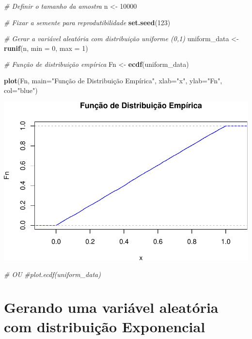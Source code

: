 \documentclass[
]{book}
\newenvironment{Shaded}{\begin{snugshade}}{\end{snugshade}}
\newcommand{\AttributeTok}[1]{\textcolor[rgb]{0.13,0.29,0.53}{#1}}
\newcommand{\CommentTok}[1]{\textcolor[rgb]{0.56,0.35,0.01}{\textit{#1}}}
\newcommand{\DecValTok}[1]{\textcolor[rgb]{0.00,0.00,0.81}{#1}}
\newcommand{\FunctionTok}[1]{\textcolor[rgb]{0.13,0.29,0.53}{\textbf{#1}}}
\newcommand{\NormalTok}[1]{#1}
\newcommand{\OtherTok}[1]{\textcolor[rgb]{0.56,0.35,0.01}{#1}}
\newcommand{\StringTok}[1]{\textcolor[rgb]{0.31,0.60,0.02}{#1}}
\begin{document}
\begin{Shaded}
\begin{Highlighting}[]
\CommentTok{\# Definir o tamanho da amostra}
\NormalTok{n }\OtherTok{\textless{}{-}} \DecValTok{10000}

\CommentTok{\# Fixar a semente para reprodutibilidade}
\FunctionTok{set.seed}\NormalTok{(}\DecValTok{123}\NormalTok{)}

\CommentTok{\# Gerar a variável aleatória com distribuição uniforme (0,1)}
\NormalTok{uniform\_data }\OtherTok{\textless{}{-}} \FunctionTok{runif}\NormalTok{(n, }\AttributeTok{min =} \DecValTok{0}\NormalTok{, }\AttributeTok{max =} \DecValTok{1}\NormalTok{)}

\CommentTok{\# Função de distribuição empírica}
\NormalTok{Fn }\OtherTok{\textless{}{-}} \FunctionTok{ecdf}\NormalTok{(uniform\_data)}

\FunctionTok{plot}\NormalTok{(Fn, }\AttributeTok{main=}\StringTok{"Função de Distribuição Empírica"}\NormalTok{,}
     \AttributeTok{xlab=}\StringTok{"x"}\NormalTok{,}
     \AttributeTok{ylab=}\StringTok{"Fn"}\NormalTok{,}
     \AttributeTok{col=}\StringTok{"blue"}\NormalTok{)}
\end{Highlighting}
\end{Shaded}

\includegraphics{meuLivro2_files/figure-latex/unnamed-chunk-137-1.pdf}

\begin{Shaded}
\begin{Highlighting}[]
\CommentTok{\# OU}
\CommentTok{\#plot.ecdf(uniform\_data)}
\end{Highlighting}
\end{Shaded}

\section{Gerando uma variável aleatória com distribuição Exponencial}\label{gerando-uma-variuxe1vel-aleatuxf3ria-com-distribuiuxe7uxe3o-exponencial}
\end{document}
